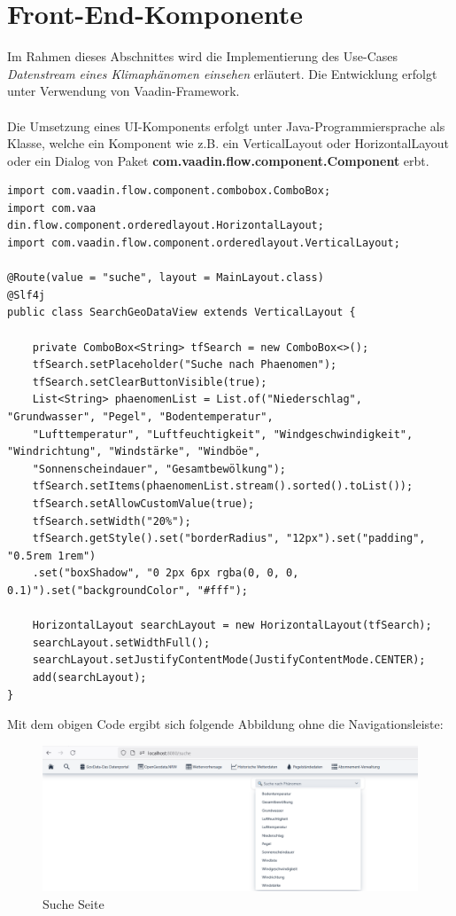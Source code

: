 \documentclass[a4paper,12pt]{scrreprt}
\begin{document}
\section{Front-End-Komponente }
Im Rahmen dieses Abschnittes wird die Implementierung des Use-Cases \textit{Datenstream eines Klimaphänomen einsehen} erläutert. Die Entwicklung erfolgt unter Verwendung von Vaadin-Framework.\\ \\
Die Umsetzung eines UI-Komponents erfolgt unter Java-Programmiersprache als Klasse, welche ein Komponent wie z.B. ein VerticalLayout oder HorizontalLayout oder ein Dialog von Paket \textbf{com.vaadin.flow.component.Component} erbt.
\begin{lstlisting}
import com.vaadin.flow.component.combobox.ComboBox;
import com.vaa
din.flow.component.orderedlayout.HorizontalLayout;
import com.vaadin.flow.component.orderedlayout.VerticalLayout;
		
@Route(value = "suche", layout = MainLayout.class)
@Slf4j
public class SearchGeoDataView extends VerticalLayout {
			
	private ComboBox<String> tfSearch = new ComboBox<>();
	tfSearch.setPlaceholder("Suche nach Phaenomen");
	tfSearch.setClearButtonVisible(true);
	List<String> phaenomenList = List.of("Niederschlag", "Grundwasser", "Pegel", "Bodentemperatur",
	"Lufttemperatur", "Luftfeuchtigkeit", "Windgeschwindigkeit", "Windrichtung", "Windstärke", "Windböe",
	"Sonnenscheindauer", "Gesamtbewölkung");
	tfSearch.setItems(phaenomenList.stream().sorted().toList());
	tfSearch.setAllowCustomValue(true);
	tfSearch.setWidth("20%");
	tfSearch.getStyle().set("borderRadius", "12px").set("padding", "0.5rem 1rem")
	.set("boxShadow", "0 2px 6px rgba(0, 0, 0, 0.1)").set("backgroundColor", "#fff");
		
	HorizontalLayout searchLayout = new HorizontalLayout(tfSearch);
	searchLayout.setWidthFull();
	searchLayout.setJustifyContentMode(JustifyContentMode.CENTER);
	add(searchLayout);
}
\end{lstlisting}
Mit dem obigen Code ergibt sich folgende Abbildung ohne die Navigationsleiste: 
\begin{figure}[h!]
	\centering
	\includegraphics[width=17cm]{suchSeite.png}
	\caption{\label{suche:Seite}Suche Seite}
\end{figure}
	
\end{document}
